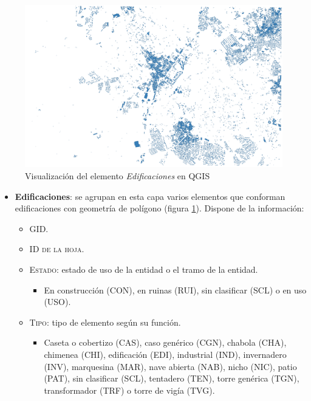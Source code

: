 \begin{enumerate}
		\begin{figure}[H]
		\centering
		\includegraphics[width=1\linewidth]{imagenes/capitulo4/edificaciones}
		\caption{Visualización del elemento \textit{Edificaciones} en QGIS}
		\label{fig:edificaciones}
	\end{figure}

	\begin{itemize}
		\item \textbf{Edificaciones}: se agrupan en esta capa varios elementos que conforman edificaciones con geometría de polígono (figura \ref{fig:edificaciones}). Dispone de la información:
		
		\begin{itemize}
			\item \textsc{GID}.	
			\item \textsc{ID de la hoja}.
			\item \textsc{Estado}: estado de uso de la entidad o el tramo de la entidad.
			\begin{itemize}
				\item 	\small{En construcción (CON), en ruinas (RUI), sin clasificar (SCL) o en uso (USO).}
			\end{itemize}
			
			\item \textsc{Tipo}: tipo de elemento según su función.
			\begin{itemize}
				\item 	\small{Caseta o cobertizo (CAS), caso genérico (CGN), chabola (CHA), chimenea (CHI), edificación (EDI), industrial (IND), invernadero (INV), marquesina (MAR), nave abierta (NAB), nicho (NIC), patio (PAT), sin clasificar (SCL), tentadero (TEN), torre genérica (TGN), transformador (TRF) o torre de vigía (TVG).}
			\end{itemize}
			 

\end{itemize}
\end{itemize}
\end{enumerate}
